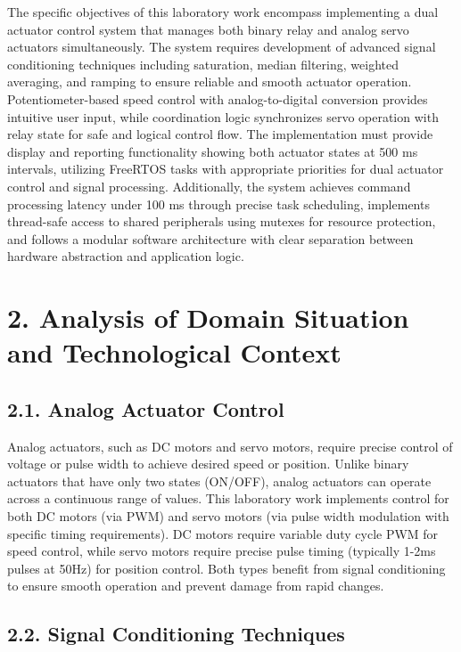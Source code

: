\documentclass[12pt]{article}
\begin{document}
The specific objectives of this laboratory work encompass implementing a dual actuator control system that manages both binary relay and analog servo actuators simultaneously. The system requires development of advanced signal conditioning techniques including saturation, median filtering, weighted averaging, and ramping to ensure reliable and smooth actuator operation. Potentiometer-based speed control with analog-to-digital conversion provides intuitive user input, while coordination logic synchronizes servo operation with relay state for safe and logical control flow. The implementation must provide display and reporting functionality showing both actuator states at 500 ms intervals, utilizing FreeRTOS tasks with appropriate priorities for dual actuator control and signal processing. Additionally, the system achieves command processing latency under 100 ms through precise task scheduling, implements thread-safe access to shared peripherals using mutexes for resource protection, and follows a modular software architecture with clear separation between hardware abstraction and application logic.

\section*{2. Analysis of Domain Situation and Technological Context}

\subsection*{2.1. Analog Actuator Control}

Analog actuators, such as DC motors and servo motors, require precise control of voltage or pulse width to achieve desired speed or position. Unlike binary actuators that have only two states (ON/OFF), analog actuators can operate across a continuous range of values. This laboratory work implements control for both DC motors (via PWM) and servo motors (via pulse width modulation with specific timing requirements). DC motors require variable duty cycle PWM for speed control, while servo motors require precise pulse timing (typically 1-2ms pulses at 50Hz) for position control. Both types benefit from signal conditioning to ensure smooth operation and prevent damage from rapid changes.

\subsection*{2.2. Signal Conditioning Techniques}
\end{document}
